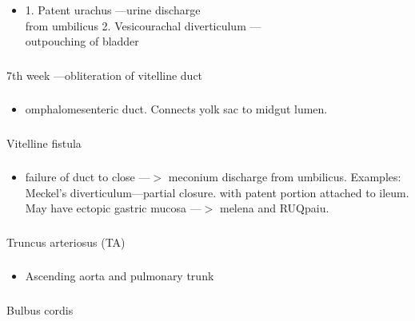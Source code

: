 \documentclass[11pt]{beamer}
\begin{document}
\begin{frame}
 \frametitle{}
\begin{itemize}
\item{1. Patent urachus —urine discharge \\ from umbilicus 2. Vesicourachal diverticulum — \\ outpouching of bladder}
\end{itemize}
\end{frame}

\begin{frame}
 \frametitle{}
7th week —obliteration of vitelline duct 
\end{frame}

\begin{frame}
 \frametitle{}
\begin{itemize}
\item{ omphalomesenteric duct. Connects yolk sac to midgut lumen. }
\end{itemize}
\end{frame}

\begin{frame}
 \frametitle{}
Vitelline fistula 
\end{frame}

\begin{frame}
 \frametitle{}
\begin{itemize}
\item{failure of duct to close —$>$ meconium discharge from umbilicus. Examples: Meckel's diverticulum—partial closure. with patent portion attached to ileum. May have ectopic gastric mucosa —$>$ melena and RUQpaiu.}
\end{itemize}
\end{frame}

\begin{frame}
 \frametitle{}
Truncus arteriosus (TA)
\end{frame}

\begin{frame}
 \frametitle{}
\begin{itemize}
\item{Ascending aorta and pulmonary trunk}
\end{itemize}
\end{frame}

\begin{frame}
 \frametitle{}
Bulbus cordis
\end{frame}
\end{document}

